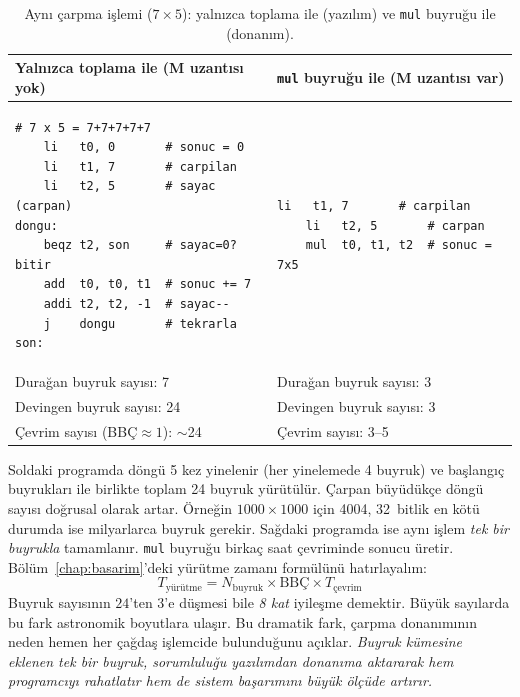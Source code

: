 \begin{table}[htbp]
\centering
\caption[Yazılım ve donanım çarpma karşılaştırması]{Aynı çarpma işlemi ($7 \times 5$): yalnızca toplama ile (yazılım) ve \texttt{mul} buyruğu ile (donanım).}
\label{tab:carpma-yazilim-donanim}
\small
\begin{tabular}{p{6.8cm}p{6.8cm}}
\toprule
\textbf{Yalnızca toplama ile (M uzantısı yok)} & \textbf{\texttt{mul} buyruğu ile (M uzantısı var)} \\
\midrule
\begin{minipage}[t]{6.5cm}
\begin{lstlisting}[style=riscv, xleftmargin=0pt]
# 7 x 5 = 7+7+7+7+7
    li   t0, 0       # sonuc = 0
    li   t1, 7       # carpilan
    li   t2, 5       # sayac (carpan)
dongu:
    beqz t2, son     # sayac=0? bitir
    add  t0, t0, t1  # sonuc += 7
    addi t2, t2, -1  # sayac--
    j    dongu       # tekrarla
son:
\end{lstlisting}
\end{minipage}
&
\begin{minipage}[t]{6.5cm}
\begin{lstlisting}[style=riscv, xleftmargin=0pt]
    li   t1, 7       # carpilan
    li   t2, 5       # carpan
    mul  t0, t1, t2  # sonuc = 7x5
\end{lstlisting}
\end{minipage}
\\
\midrule
Durağan buyruk sayısı: 7 & Durağan buyruk sayısı: 3 \\
Devingen buyruk sayısı: 24 & Devingen buyruk sayısı: 3 \\
Çevrim sayısı (BBÇ${}\approx 1$): $\sim$24 & Çevrim sayısı: 3--5 \\
\bottomrule
\end{tabular}
\end{table}

Soldaki programda döngü 5 kez yinelenir (her yinelemede 4 buyruk) ve başlangıç buyrukları ile birlikte toplam 24 buyruk yürütülür. Çarpan büyüdükçe döngü sayısı doğrusal olarak artar. Örneğin $1000 \times 1000$ için 4004, 32~bitlik en kötü durumda ise milyarlarca buyruk gerekir. Sağdaki programda ise aynı işlem \emph{tek bir buyrukla} tamamlanır. \texttt{mul} buyruğu birkaç saat çevriminde sonucu üretir. Bölüm~\ref{chap:basarim}'deki yürütme zamanı formülünü hatırlayalım:
%
\[
T_{\text{yürütme}} = N_{\text{buyruk}} \times \text{BBÇ} \times T_{\text{çevrim}}
\]
%
Buyruk sayısının $24$'ten $3$'e düşmesi bile \emph{8 kat} iyileşme demektir. Büyük sayılarda bu fark astronomik boyutlara ulaşır. Bu dramatik fark, çarpma donanımının neden hemen her çağdaş işlemcide bulunduğunu açıklar. \emph{Buyruk kümesine eklenen tek bir buyruk, sorumluluğu yazılımdan donanıma aktararak hem programcıyı rahatlatır hem de sistem başarımını büyük ölçüde artırır.}


